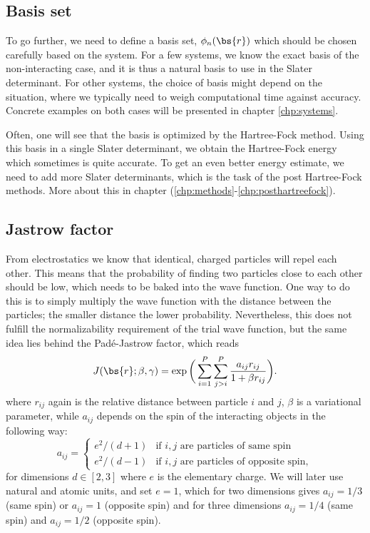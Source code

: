 \subsection{Basis set} \label{subsec:basisset}
To go further, we need to define a basis set, $\phi_n(\bs{r})$ which should be chosen carefully based on the system. For a few systems, we know the exact basis of the non-interacting case, and it is thus a natural basis to use in the Slater determinant. For other systems, the choice of basis might depend on the situation, where we typically need to weigh computational time against accuracy. Concrete examples on both cases will be presented in chapter \eqref{chp:systems}.

Often, one will see that the basis is optimized by the Hartree-Fock method. Using this basis in a single Slater determinant, we obtain the Hartree-Fock energy which sometimes is quite accurate. To get an even better energy estimate, we need to add more Slater determinants, which is the task of the post Hartree-Fock methods. More about this in chapter (\ref{chp:methods}-\ref{chp:posthartreefock}).

\subsection{Jastrow factor} \label{subsubsec:jastrow}
From electrostatics we know that identical, charged particles will repel each other. This means that the probability of finding two particles close to each other should be low, which needs to be baked into the wave function. One way to do this is to simply multiply the wave function with the distance between the particles; the smaller distance the lower probability. Nevertheless, this does not fulfill the normalizability requirement of the trial wave function, but the same idea lies behind the Padé-Jastrow factor, which reads
\begin{equation}
J(\bs{r}; \beta, \gamma) = \exp\bigg(\sum_{i=1}^P\sum_{j>i}^P\frac{a_{ij}r_{ij}}{1+\beta r_{ij}}\bigg).
\label{eq:PadeJastrow}
\end{equation}
where $r_{ij}$ again is the relative distance between particle $i$ and $j$, $\beta$ is a variational parameter, while $a_{ij}$ depends on the spin of the interacting objects in the following way:
\begin{equation}
\label{eq:ajastrow}
a_{ij}=
\begin{cases} 
e^2/(d+1) & \text{if $i,j$ are particles of same spin} \\
e^2/(d-1) & \text{if $i,j$ are particles of opposite spin},
\end{cases}
\end{equation}
for dimensions $d\in[2,3]$ where $e$ is the elementary charge. We will later use natural and atomic units, and set $e=1$, which for two dimensions gives $a_{ij}=1/3$ (same spin) or $a_{ij}=1$ (opposite spin) and for three dimensions $a_{ij}=1/4$ (same spin) and $a_{ij}=1/2$ (opposite spin).


